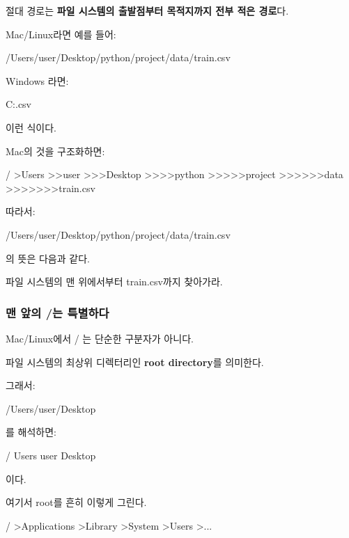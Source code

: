 절대 경로는 \textbf{파일 시스템의 출발점부터 목적지까지 전부 적은 경로}다.

Mac/Linux라면 예를 들어:

\begin{dhkzsh}
/Users/user/Desktop/python/project/data/train.csv
\end{dhkzsh}

Windows 라면:

\begin{dhkzsh}
C:\Users\user\Desktop\python\project\data\train.csv
\end{dhkzsh}

이런 식이다.

Mac의 것을 구조화하면:

\begin{dhkdir}
/
>Users
>>user
>>>Desktop
>>>>python
>>>>>project
>>>>>>data
>>>>>>>train.csv
\end{dhkdir}

따라서:

\begin{dhkzsh}
/Users/user/Desktop/python/project/data/train.csv
\end{dhkzsh}

의 뜻은 다음과 같다.

\begin{dhksmry}[centered]
파일 시스템의 맨 위에서부터 train.csv까지 찾아가라.
\end{dhksmry}

\subsubsection{맨 앞의 /는 특별하다}

Mac/Linux에서 / 는 단순한 구분자가 아니다.

파일 시스템의 최상위 디렉터리인 \textbf{root directory}를 의미한다.

그래서:

\begin{dhkcode}
/Users/user/Desktop
\end{dhkcode}

를 해석하면:

\begin{dhksmry}[centered]
/
\da
Users
\da
user
\da
Desktop
\end{dhksmry}

이다.

여기서 root를 흔히 이렇게 그린다.

\begin{dhkdir}
/
>Applications
>Library
>System
>Users
>...
\end{dhkdir}

